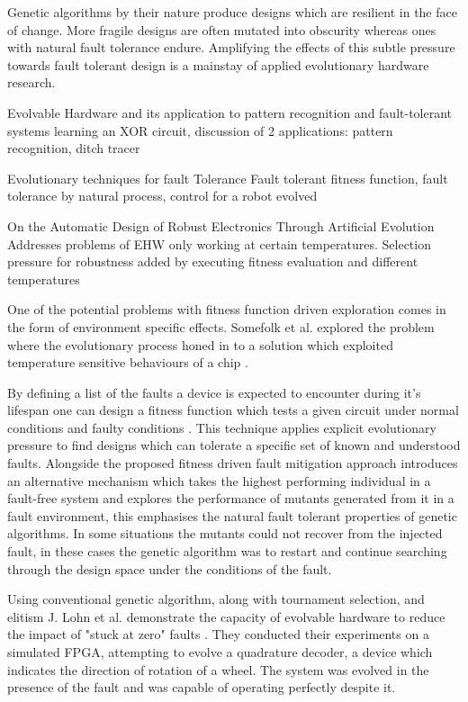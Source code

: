 Genetic algorithms by their nature produce designs which are resilient in the face
of change. More fragile designs are often mutated into obscurity whereas ones with
natural fault tolerance endure. Amplifying the effects of this subtle pressure towards fault
tolerant design is a mainstay of applied evolutionary hardware research.

\todo Evolvable Hardware and its application to pattern recognition and fault-tolerant systems\cite{10.1007/3-540-61093-6_6}
learning an XOR circuit, discussion of 2 applications: pattern recognition, ditch tracer

\todo Evolutionary techniques for fault Tolerance\cite{651463}
Fault tolerant fitness function, fault tolerance by natural process, control for a robot evolved

\todo On the Automatic Design of Robust Electronics Through Artificial Evolution
Addresses problems of EHW only working at certain temperatures. Selection pressure
for robustness added by executing fitness evaluation and different temperatures

One of the potential problems with fitness function driven exploration comes in
the form of environment specific effects. Somefolk et al. explored the problem
where the evolutionary process honed in to a solution which exploited temperature
sensitive behaviours of a chip \cite{10.1007/BFb0057603}.

By defining a list of the faults a device is expected to encounter during it's
lifespan one can design a fitness function which tests a given circuit under
normal conditions and faulty conditions \cite{Keymeulen2000}. This technique applies explicit
evolutionary pressure to find designs which can tolerate a specific set of
known and understood faults. Alongside the proposed fitness driven fault mitigation
approach \cite{Keymeulen2000} introduces an alternative mechanism which takes the
highest performing individual in a fault-free system and explores the performance
of mutants generated from it in a fault environment, this emphasises the natural
fault tolerant properties of genetic algorithms. In some situations the mutants
could not recover from the injected fault, in these cases the genetic algorithm
was to restart and continue searching through the design space under the conditions
of the fault.

Using conventional genetic algorithm, along with tournament selection, and elitism
J. Lohn et al. demonstrate the capacity
of evolvable hardware to reduce the impact of "stuck at zero" faults \cite{10.1007/3-540-36553-2_5}. They
conducted their experiments on a simulated FPGA, attempting to evolve a quadrature
decoder, a device which indicates
the direction of rotation of a wheel. The system was evolved in the presence
of the fault and was capable of operating perfectly despite it.

